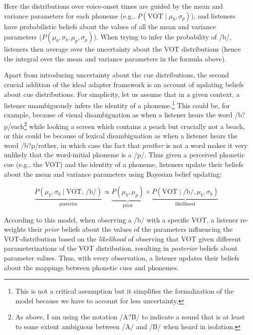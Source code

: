\noindent Here the distributions over voice-onset times are guided by the mean and variance parameters for each phoneme (e.g.,  $P(\mbox{VOT}\mid \mu_b, \sigma_p)$), and listeners
have probabilistic beliefs about the values of all the mean and variance parameters ($P(\mu_b, \sigma_b, \mu_p, \sigma_p)$). When trying to infer the probability of /b/, listeners then
average over the uncertainty about the VOT distributions (hence the integral over the mean and variance parameters in the formula above). 

Apart from introducing uncertainty about the cue distributions, the second crucial addition of the ideal adapter framework is an account of updating beliefs about cue distributions. For simplicity,
let us assume that in a given context, a listener unambiguously infers the identity of a phoneme.\footnote{This is not a critical assumption but it simplifies the formalization of the model because we have to account for less uncertainty.} This could be, for example, because of visual disambiguation as when a listener hears the word /b?p/each\footnote{As above, I am using the notation /A?B/ to indicate a sound that is at least to some extent ambiguous between /A/ and /B/ when heard in isolation.} 
while looking a screen which contains a peach but crucially not a beach, or this could be because of lexical disambiguation as when a listener hears the word /b?p/rother, in which case the fact that \textit{prother} is not a
word makes it very unlikely that the word-initial phoneme is a /p/. Thus given a perceived phonetic cue (e.g., the VOT) and the identity of a phoneme, listeners update their beliefs about the mean and variance parameters 
using Bayesian belief updating:

$$ \underbrace{P(\mu_b, \sigma_b \mid \mbox{VOT, /b/})}_{\text{posterior}} \propto \underbrace{P(\mu_b, \mu_p)}_{\text{prior}} \times   \underbrace{P(\mbox{VOT} \mid \mbox{/b/}, \mu_b, \sigma_b)}_{\text{likelihood}} $$

\noindent According to this model, when observing a /b/ with a specific VOT, a listener re-weights their \textit{prior} beliefs about the values of the parameters influencing the VOT-distribution based on the \textit{likelihood} of observing that VOT given different parameterizations of the VOT distribution, resulting in \textit{posterior} beliefs about parameter values. Thus, with every observation, a listener updates their beliefs about the mappings between phonetic cues and phonemes. 

